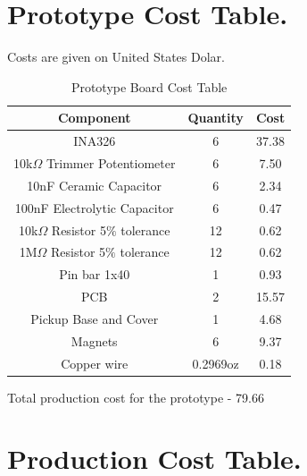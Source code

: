 \chapter{Prototype Cost Table.}

Costs are given on United States Dolar.\\
\begin{table}[htb]
  \begin{center}
    \ABNTEXreducedfont
    \caption[Prototype Board Cost Table]{Prototype Board Cost Table}
    \label{Prototype-cost}
    \begin{tabular}{c|c|c}
      \textbf{Component} & \textbf{Quantity} & \textbf{Cost} \\
    \hline
    \hline
    INA326 & 6 & 37.38\\ \hline
    10k$\Omega$ Trimmer Potentiometer & 6 & 7.50 \\ \hline
    10nF Ceramic Capacitor & 6 & 2.34 \\ \hline
    100nF Electrolytic Capacitor & 6 & 0.47 \\ \hline
    10k$\Omega$ Resistor 5$\%$ tolerance & 12 & 0.62 \\ \hline
    1M$\Omega$ Resistor 5$\%$ tolerance & 12 & 0.62 \\ \hline
    Pin bar 1x40 & 1 & 0.93 \\ \hline
    PCB & 2 & 15.57 \\ \hline
    Pickup Base and Cover & 1 & 4.68 \\ \hline
    Magnets & 6 & 9.37 \\ \hline
    Copper wire & 0.2969oz & 0.18 \\ \hline
  \end{tabular}
\end{center}
\end{table}

Total production cost for the prototype - 79.66

\chapter{Production Cost Table.}

